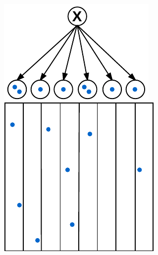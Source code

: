 \begin{figure}
	\begin{center}
		\begin{subfloat}{%
			\includegraphics[scale=0.65]{figures/multigrid_root_tree.pdf}
			\includegraphics[scale=0.65]{figures/multigrid_root.pdf}
		}
		\end{subfloat}~~~~~

\end{center}
\end{figure}
